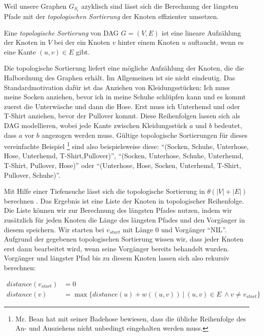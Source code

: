 Weil unsere Graphen $G_{S_i}$ azyklisch sind lässt sich die Berechnung der längsten Pfade mit der \emph{topologischen Sortierung} der Knoten effizienter umsetzen.

\begin{definition}
	Eine \emph{topologische Sortierung} von DAG $G = (V,E)$ ist eine lineare Aufzählung der Knoten in $V$ bei der ein Knoten $v$ hinter einem Knoten $u$ auftaucht, wenn es eine Kante $(u,v)\in E$ gibt.
\end{definition}

Die topologische Sortierung liefert eine mögliche Aufzählung der Knoten, die die Halbordnung des Graphen erhält. Im Allgemeinen ist sie nicht eindeutig. Das Standardmotivation dafür ist das Anziehen von Kleidungsstücken: Ich muss meine Socken anziehen, bevor ich in meine Schuhe schlüpfen kann und es kommt zuerst die Unterwäsche und dann die Hose. Erst muss ich Unterhemd und oder T-Shirt anziehen, bevor der Pullover kommt. Diese Reihenfolgen lassen sich als DAG modellieren, wobei jede Kante zwischen Kleidungsstück $a$ und $b$ bedeutet, dass $a$ vor $b$ angezogen werden muss. Gültige topologische Sortierungen für dieses vereinfachte Beispiel \footnote{Mr. Bean hat mit seiner Badehose bewiesen, dass die übliche Reihenfolge des An- und Ausziehens nicht unbedingt eingehalten werden muss.} sind also beispielsweise diese: \enquote{(Socken, Schuhe, Unterhose, Hose, Unterhemd, T-Shirt,Pullover)}, \enquote{(Socken, Unterhose, Schuhe, Unterhemd, T-Shirt, Pullover, Hose)} oder \enquote{(Unterhose, Hose, Socken, Unterhemd, T-Shirt, Pullover, Schuhe)}. 

Mit Hilfe einer Tiefensuche lässt sich die topologische Sortierung in $\theta(|V| + |E|)$ berechnen \cite[S.612ff.]{clrs09}. Das Ergebnis ist eine Liste der Knoten in topologischer Reihenfolge. Die Liste können wir zur Berechnung des längsten Pfades nutzen, indem wir zusätzlich für jeden Knoten die Länge des längsten Pfades und den Vorgänger in diesem speichern. Wir starten bei $v_{start}$ mit Länge 0 und Vorgänger \enquote{NIL}. Aufgrund der gegebenen topologischen Sortierung wissen wir, dass jeder Knoten erst dann bearbeitet wird, wenn seine Vorgänger bereits behandelt wurden. Vorgänger und längster Pfad bis zu diesem Knoten lassen sich also rekursiv berechnen:

\begin{equation}
\begin{split}
	distance(v_{start}) & = 0 \\
	distance(v)       & = \max\{distance(u) + w((u,v))\:|\:(u,v) \in E\ \wedge v \neq v_{start}\} 
\end{split}
\end{equation} 

